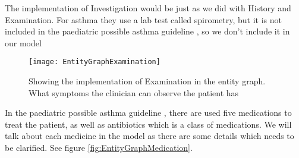 The implementation of Investigation would be just as we did with History and Examination. For asthma they use a lab test called spirometry, but it is not included in the paediatric possible asthma guideline \parencite{RepublicofKeny2016}, so we don't include it in our model

\begin{figure}[h!]
	\caption {Showing the implementation of Examination in the entity graph. What symptoms the clinician can observe the patient has}
	\label{fig:EntityGraphExamination}
	\texttt{[image: EntityGraphExamination]}
\end{figure}

In the paediatric possible asthma guideline \parencite{RepublicofKeny2016}, there are used five medications to treat the patient, as well as antibiotics which is a class of medications. We will talk about each medicine in the model as there are some details which needs to be clarified. See figure \ref{fig:EntityGraphMedication}.


